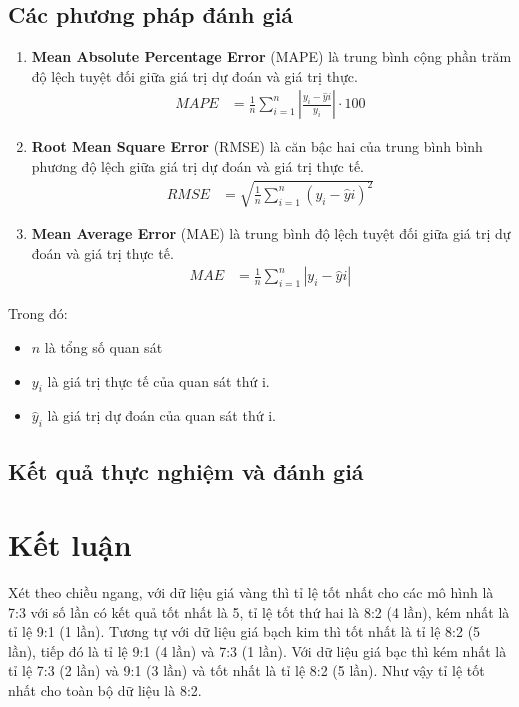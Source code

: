 \documentclass[conference]{IEEEtran}
\begin{document}
\subsection{Các phương pháp đánh giá}
\begin{enumerate}
    \item \textbf{Mean Absolute Percentage Error} (MAPE) là trung bình cộng phần trăm độ lệch tuyệt đối giữa giá trị dự đoán và giá trị thực.
    \begin{align*}
    MAPE &= \frac{1}{n} \sum_{i=1}^n \left|\frac{y_i - \hat{y}i}{y_i}\right| \cdot 100 \
    \end{align*}
    \item \textbf{Root Mean Square Error} (RMSE) là căn bậc hai của trung bình bình phương độ lệch giữa giá trị dự đoán và giá trị thực tế.
    \begin{align*}
    RMSE &= \sqrt{\frac{1}{n} \sum_{i=1}^n (y_i - \hat{y}i)^2} \
    \end{align*}
    \item \textbf{Mean Average Error} (MAE) là trung bình độ lệch tuyệt đối giữa giá trị dự đoán và giá trị thực tế.
    \begin{align*}
    MAE &= \frac{1}{n} \sum_{i=1}^n |y_i - \hat{y}i| \
    \end{align*}
\end{enumerate}

\indent Trong đó:
\begin{itemize}
    \item $n$ là tổng số quan sát
    \item $y_i$ là giá trị thực tế của quan sát thứ i.
    \item $\hat{y}_i$ là giá trị dự đoán của quan sát thứ i.
\end{itemize}


\subsection{Kết quả thực nghiệm và đánh giá}

\section{Kết luận}

\indent Xét theo chiều ngang, với dữ liệu giá vàng thì tỉ lệ tốt nhất cho các mô hình là 7:3 với số lần có kết quả tốt nhất là 5, tỉ lệ tốt thứ hai là 8:2 (4 lần), kém nhất là tỉ lệ 9:1 (1 lần). Tương tự với dữ liệu giá bạch kim thì tốt nhất là tỉ lệ 8:2 (5 lần), tiếp đó là tỉ lệ 9:1 (4 lần) và 7:3 (1 lần). Với dữ liệu giá bạc thì kém nhất là tỉ lệ 7:3 (2 lần) và 9:1 (3 lần) và tốt nhất là tỉ lệ 8:2 (5 lần). Như vậy tỉ lệ tốt nhất cho toàn bộ dữ liệu là 8:2.
\end{document}
